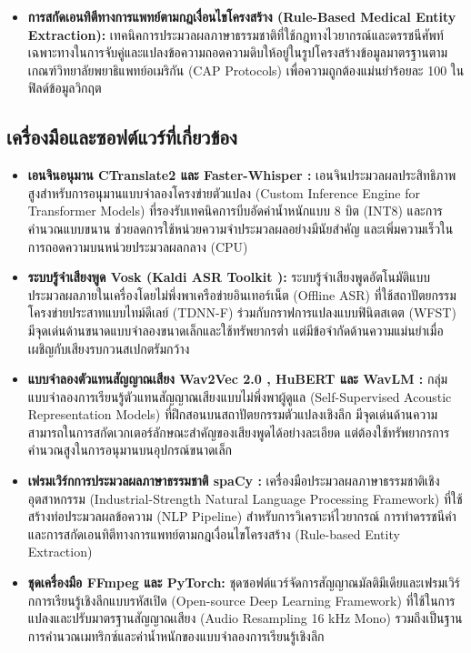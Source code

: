 \begin{itemize}
    \item \textbf{การสกัดเอนทิตีทางการแพทย์ตามกฎเงื่อนไขโครงสร้าง (Rule-Based Medical Entity Extraction):} เทคนิคการประมวลผลภาษาธรรมชาติที่ใช้กฎทางไวยากรณ์และดรรชนีศัพท์เฉพาะทางในการจับคู่และแปลงข้อความถอดความดิบให้อยู่ในรูปโครงสร้างข้อมูลมาตรฐานตามเกณฑ์วิทยาลัยพยาธิแพทย์อเมริกัน (CAP Protocols) เพื่อความถูกต้องแม่นยำร้อยละ 100 ในฟิลด์ข้อมูลวิกฤต \cite{cap_breast}
\end{itemize}

\subsection{เครื่องมือและซอฟต์แวร์ที่เกี่ยวข้อง}
\begin{itemize}
    \item \textbf{เอนจินอนุมาน CTranslate2 \cite{ctranslate2} และ Faster-Whisper \cite{fasterwhisper}:} เอนจินประมวลผลประสิทธิภาพสูงสำหรับการอนุมานแบบจำลองโครงข่ายตัวแปลง (Custom Inference Engine for Transformer Models) ที่รองรับเทคนิคการบีบอัดค่าน้ำหนักแบบ 8 บิต (INT8) และการคำนวณแบบขนาน ช่วยลดการใช้หน่วยความจำประมวลผลอย่างมีนัยสำคัญ และเพิ่มความเร็วในการถอดความบนหน่วยประมวลผลกลาง (CPU)
    \item \textbf{ระบบรู้จำเสียงพูด Vosk \cite{vosk} (Kaldi ASR Toolkit \cite{povey2011kaldi}):} ระบบรู้จำเสียงพูดอัตโนมัติแบบประมวลผลภายในเครื่องโดยไม่พึ่งพาเครือข่ายอินเทอร์เน็ต (Offline ASR) ที่ใช้สถาปัตยกรรมโครงข่ายประสาทแบบไทม์ดีเลย์ (TDNN-F) ร่วมกับกราฟการแปลงแบบฟินิตสเตต (WFST) มีจุดเด่นด้านขนาดแบบจำลองขนาดเล็กและใช้ทรัพยากรต่ำ แต่มีข้อจำกัดด้านความแม่นยำเมื่อเผชิญกับเสียงรบกวนสเปกตรัมกว้าง
    \item \textbf{แบบจำลองตัวแทนสัญญาณเสียง Wav2Vec 2.0 \cite{baevski2020wav2vec}, HuBERT \cite{hsu2021hubert} และ WavLM \cite{chen2022wavlm}:} กลุ่มแบบจำลองการเรียนรู้ตัวแทนสัญญาณเสียงแบบไม่พึ่งพาผู้ดูแล (Self-Supervised Acoustic Representation Models) ที่ฝึกสอนบนสถาปัตยกรรมตัวแปลงเชิงลึก มีจุดเด่นด้านความสามารถในการสกัดเวกเตอร์ลักษณะสำคัญของเสียงพูดได้อย่างละเอียด แต่ต้องใช้ทรัพยากรการคำนวณสูงในการอนุมานบนอุปกรณ์ขนาดเล็ก
    \item \textbf{เฟรมเวิร์กการประมวลผลภาษาธรรมชาติ spaCy \cite{honnibal2020spacy}:} เครื่องมือประมวลผลภาษาธรรมชาติเชิงอุตสาหกรรม (Industrial-Strength Natural Language Processing Framework) ที่ใช้สร้างท่อประมวลผลข้อความ (NLP Pipeline) สำหรับการวิเคราะห์ไวยากรณ์ การทำดรรชนีคำ และการสกัดเอนทิตีทางการแพทย์ตามกฎเงื่อนไขโครงสร้าง (Rule-based Entity Extraction)
    \item \textbf{ชุดเครื่องมือ FFmpeg \cite{ffmpeg_afftdn} และ PyTorch:} ชุดซอฟต์แวร์จัดการสัญญาณมัลติมีเดียและเฟรมเวิร์กการเรียนรู้เชิงลึกแบบรหัสเปิด (Open-source Deep Learning Framework) ที่ใช้ในการแปลงและปรับมาตรฐานสัญญาณเสียง (Audio Resampling 16 kHz Mono) รวมถึงเป็นฐานการคำนวณเมทริกซ์และค่าน้ำหนักของแบบจำลองการเรียนรู้เชิงลึก

\end{itemize}
